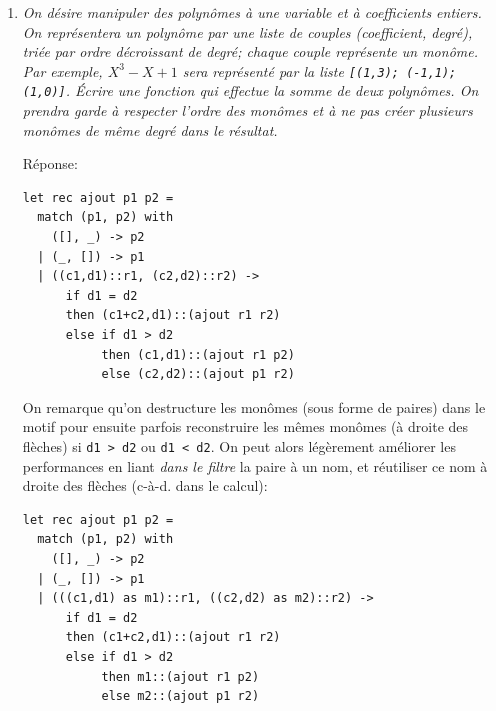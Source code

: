 \documentclass[a4paper]{article}
\begin{document}
\begin{enumerate}
\begin{itemize}
              \medskip

              Réponse:

              {\small
              \begin{verbatim}
# let rec eval env = function
    Pi            -> acos (-1.0)
  | Var (x)       -> List.assoc x env
  | Plus (e1, e2) -> eval env e1 +. eval env e2
  | Sin (e)       -> sin (eval env e)
  | Cos (e)       -> cos (eval env e)
  | Tan (e)       -> tan (eval env e)
  ;;
val eval : (string * float) list -> expression -> float = <fun>
              \end{verbatim}
              }

      \end{itemize}

  \item \emph{On désire manipuler des polynômes à une variable et à
        coefficients entiers. On représentera un polynôme par une
        liste de couples (coefficient, degré), triée par ordre
        décroissant de degré; chaque couple représente un monôme. Par
        exemple, $X^3-X+1$ sera représenté par la liste
        \texttt{[(1,3); (-1,1); (1,0)]}. Écrire une fonction qui
        effectue la somme de deux polynômes. On prendra garde à
        respecter l'ordre des monômes et à ne pas créer plusieurs
        monômes de même degré dans le résultat.}

        \smallskip

        Réponse:

        \begin{verbatim}
let rec ajout p1 p2 =
  match (p1, p2) with
    ([], _) -> p2
  | (_, []) -> p1
  | ((c1,d1)::r1, (c2,d2)::r2) ->
      if d1 = d2
      then (c1+c2,d1)::(ajout r1 r2)
      else if d1 > d2
           then (c1,d1)::(ajout r1 p2)
           else (c2,d2)::(ajout p1 r2)
        \end{verbatim}

On remarque qu'on destructure les monômes (sous forme de paires) dans
le motif pour ensuite parfois reconstruire les mêmes monômes (à droite
des flèches) si \texttt{d1 > d2} ou \texttt{d1 < d2}. On peut alors
légèrement améliorer les performances en liant \emph{dans le filtre}
la paire à un nom, et réutiliser ce nom à droite des flèches
(c-à-d. dans le calcul):

        \begin{verbatim}
let rec ajout p1 p2 =
  match (p1, p2) with
    ([], _) -> p2
  | (_, []) -> p1
  | (((c1,d1) as m1)::r1, ((c2,d2) as m2)::r2) ->
      if d1 = d2
      then (c1+c2,d1)::(ajout r1 r2)
      else if d1 > d2
           then m1::(ajout r1 p2)
           else m2::(ajout p1 r2)
        \end{verbatim}


\end{enumerate}
\end{document}

